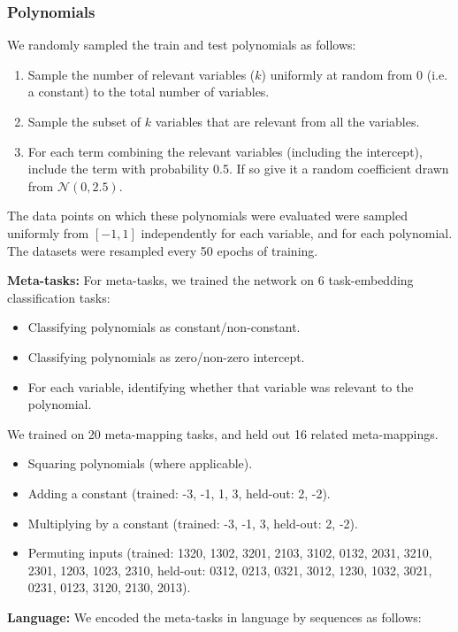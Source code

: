\subsubsection{Polynomials} \label{meth_data_poly}
We randomly sampled the train and test polynomials as follows:
\begin{enumerate}
\item Sample the number of relevant variables ($k$) uniformly at random from 0 (i.e. a constant) to the total number of variables.
\item Sample the subset of $k$ variables that are relevant from all the variables.
\item For each term combining the relevant variables (including the intercept), include the term with probability 0.5. If so give it a random coefficient drawn from $\mathcal{N}(0, 2.5)$.
\end{enumerate}
The data points on which these polynomials were evaluated were sampled uniformly from $[-1, 1]$ independently for each variable, and for each polynomial. The datasets were resampled every 50 epochs of training. \par
\textbf{Meta-tasks:} For meta-tasks, we trained the network on 6 task-embedding classification tasks:
\begin{itemize}
\item Classifying polynomials as constant/non-constant.
\item Classifying polynomials as zero/non-zero intercept.
\item For each variable, identifying whether that variable was relevant to the polynomial.
\end{itemize}
We trained on 20 meta-mapping tasks, and held out 16 related meta-mappings.
\begin{itemize}
\item Squaring polynomials (where applicable).
\item Adding a constant (trained: -3, -1, 1, 3, held-out: 2, -2).
\item Multiplying by a constant (trained: -3, -1, 3, held-out: 2, -2).
\item Permuting inputs (trained: 1320, 1302, 3201, 2103, 3102, 0132, 2031, 3210, 2301, 1203, 1023, 2310, held-out: 0312, 0213, 0321, 3012, 1230, 1032, 3021, 0231, 0123, 3120, 2130, 2013).
\end{itemize}
\textbf{Language:} We encoded the meta-tasks in language by sequences as follows:
